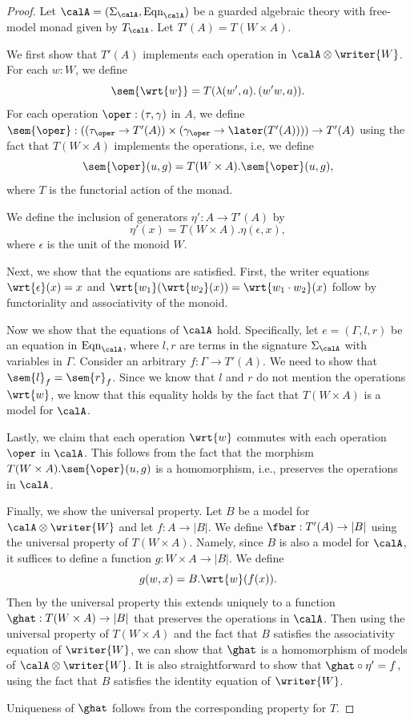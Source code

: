 \begin{proof}
    Let $\calA = (\Sigma_\calA, \text{Eqn}_\calA)$ be a guarded algebraic theory with
    free-model monad given by $T_\calA$. Let $T'(A) = T(W \times A)$.

    We first show that $T'(A)$ implements each operation in $\calA \otimes
    \writer{W}$. For each $w : W$, we define 
    \[ \sem{\wrt{w}} = T(\lambda(w',a).\, (w'w, a)). \]
    For each operation $\oper : (\tau, \gamma)$ in $A$, we define $\sem{\oper} :
    ((\tau_\oper \to T'(A)) \times (\gamma_\oper \to \later (T'(A)))) \to T'(A)$
    using the fact that $T(W \times A)$ implements the operations, i.e, we define
    \[ \sem{\oper}(u, g) = T(W \times A).\sem{\oper}(u, g), \]
    where $T$ is the functorial action of the monad.
    
    We define the inclusion of generators $\eta' : A \to T'(A)$ by
    \[ \eta'(x) = T(W \times A).\eta(\epsilon, x), \]
    where $\epsilon$ is the unit of the monoid $W$.

    Next, we show that the equations are satisfied. First, the writer equations
    $\wrt{\epsilon}(x) = x$ and $\wrt{w_1}(\wrt{w_2}(x)) = \wrt{w_1 \cdot
    w_2}(x)$ follow by functoriality and associativity of the monoid.

    Now we show that the equations of $\calA$ hold. Specifically, let $e =
    (\Gamma, l, r)$ be an equation in $\text{Eqn}_\calA$, where $l, r$ are terms
    in the signature $\Sigma_\calA$ with variables in $\Gamma$. Consider an
    arbitrary $f : \Gamma \to T'(A)$. We need to show that $\sem{l}_f =
    \sem{r}_f$. Since we know that $l$ and $r$ do not mention the operations
    $\wrt{w}$, we know that this equality holds by the fact that $T(W \times A)$
    is a model for $\calA$.

    Lastly, we claim that each operation $\wrt{w}$ commutes with each operation
    $\oper$ in $\calA$. This follows from the fact that the morphism $T(W \times
    A).\sem{\oper}(u, g)$ is a homomorphism, i.e., preserves the operations in
    $\calA$.

    Finally, we show the universal property. Let $B$ be a model for $\calA \otimes
    \writer{W}$ and let $f : A \to |B|$. We define $\fbar : T'(A) \to |B|$ using
    the universal property of $T(W \times A)$. Namely, since $B$ is also a model for
    $\calA$, it suffices to define a function $g : W \times A \to |B|$. We define
    \[ g(w,x) = B.\wrt{w}(f(x)). \] 
    Then by the universal property this extends uniquely to a function $\ghat :
    T(W \times A) \to |B|$ that preserves the operations in $\calA$.
    Then using the universal property of $T(W \times A)$ and the fact that $B$
    satisfies the associativity equation of $\writer{W}$, we can show that
    $\ghat$ is a homomorphism of models of $\calA \otimes \writer{W}$.
    It is also straightforward to show that $\ghat \circ \eta' = f$, using the
    fact that $B$ satisfies the identity equation of $\writer{W}$.

    Uniqueness of $\ghat$ follows from the corresponding property for $T$.
\end{proof}



